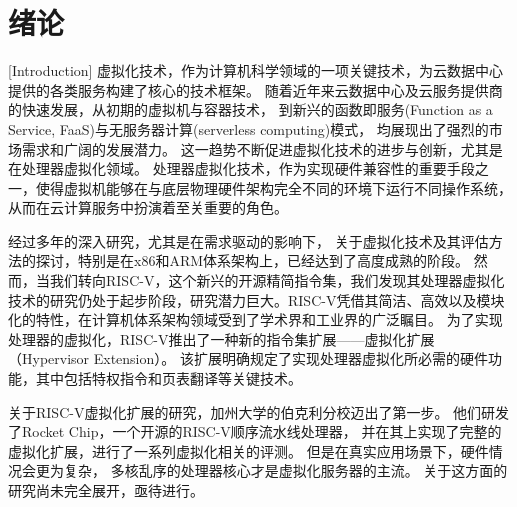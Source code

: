 \chapter{绪论}[Introduction]
虚拟化技术，作为计算机科学领域的一项关键技术，为云数据中心提供的各类服务构建了核心的技术框架。
随着近年来云数据中心及云服务提供商的快速发展，从初期的虚拟机与容器技术，
到新兴的函数即服务(Function as a Service, FaaS)与无服务器计算(serverless computing)模式，
均展现出了强烈的市场需求和广阔的发展潜力。
这一趋势不断促进虚拟化技术的进步与创新，尤其是在处理器虚拟化领域。
处理器虚拟化技术，作为实现硬件兼容性的重要手段之一，使得虚拟机能够在与底层物理硬件架构完全不同的环境下运行不同操作系统，从而在云计算服务中扮演着至关重要的角色。

经过多年的深入研究，尤其是在需求驱动的影响下，
关于虚拟化技术及其评估方法的探讨，特别是在x86和ARM体系架构上，已经达到了高度成熟的阶段。
然而，当我们转向RISC-V，这个新兴的开源精简指令集，我们发现其处理器虚拟化技术的研究仍处于起步阶段，研究潜力巨大。RISC-V凭借其简洁、高效以及模块化的特性，在计算机体系架构领域受到了学术界和工业界的广泛瞩目。
为了实现处理器的虚拟化，RISC-V推出了一种新的指令集扩展——虚拟化扩展（Hypervisor Extension）。
该扩展明确规定了实现处理器虚拟化所必需的硬件功能，其中包括特权指令和页表翻译等关键技术。

关于RISC-V虚拟化扩展的研究，加州大学的伯克利分校迈出了第一步。
他们研发了Rocket Chip，一个开源的RISC-V顺序流水线处理器，
并在其上实现了完整的虚拟化扩展，进行了一系列虚拟化相关的评测。
但是在真实应用场景下，硬件情况会更为复杂，
多核乱序的处理器核心才是虚拟化服务器的主流。
关于这方面的研究尚未完全展开，亟待进行。